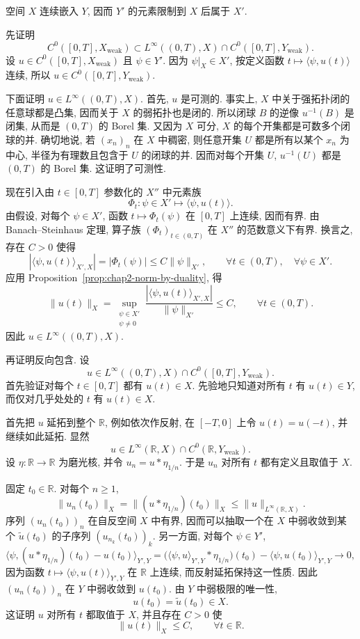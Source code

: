 \begin{Proof}
空间 $X$ 连续嵌入 $Y$, 因而 $Y'$ 的元素限制到 $X$ 后属于 $X'$.

先证明
\[
 C^0([0,T],X_{\mathrm{weak}})
 \subset L^\infty((0,T),X)\cap C^0([0,T],Y_{\mathrm{weak}}).
\]
设 $u\in C^0([0,T],X_{\mathrm{weak}})$ 且 $\psi\in Y'$. 因为 $\psi|_X\in X'$, 按定义函数 $t\mapsto\langle\psi,u(t)\rangle$ 连续, 所以 $u\in C^0([0,T],Y_{\mathrm{weak}})$.

下面证明 $u\in L^\infty((0,T),X)$. 首先, $u$ 是可测的. 事实上, $X$ 中关于强拓扑闭的任意球都是凸集, 因而关于 $X$ 的弱拓扑也是闭的. 所以闭球 $B$ 的逆像 $u^{-1}(B)$ 是闭集, 从而是 $(0,T)$ 的 Borel 集. 又因为 $X$ 可分, $X$ 的每个开集都是可数多个闭球的并. 确切地说, 若 $(x_n)_n$ 在 $X$ 中稠密, 则任意开集 $U$ 都是所有以某个 $x_n$ 为中心, 半径为有理数且包含于 $U$ 的闭球的并. 因而对每个开集 $U$, $u^{-1}(U)$ 都是 $(0,T)$ 的 Borel 集. 这证明了可测性.

现在引入由 $t\in[0,T]$ 参数化的 $X''$ 中元素族
\[
 \Phi_t:\psi\in X'\longmapsto\langle\psi,u(t)\rangle.
\]
由假设, 对每个 $\psi\in X'$, 函数 $t\mapsto\Phi_t(\psi)$ 在 $[0,T]$ 上连续, 因而有界. 由 Banach--Steinhaus 定理, 算子族 $(\Phi_t)_{t\in(0,T)}$ 在 $X''$ 的范数意义下有界. 换言之, 存在 $C>0$ 使得
\[
 |\langle\psi,u(t)\rangle_{X',X}|=|\Phi_t(\psi)|
 \leq C\|\psi\|_{X'},
 \qquad\forall t\in(0,T),\quad\forall\psi\in X'.
\]
应用 Proposition~\ref{prop:chap2-norm-by-duality}, 得
\[
 \|u(t)\|_X
 =\sup_{\substack{\psi\in X'\\\psi\neq0}}
 \frac{|\langle\psi,u(t)\rangle_{X',X}|}{\|\psi\|_{X'}}
 \leq C,
 \qquad\forall t\in(0,T).
\]
因此 $u\in L^\infty((0,T),X)$.

再证明反向包含. 设
\[
 u\in L^\infty((0,T),X)\cap C^0([0,T],Y_{\mathrm{weak}}).
\]
首先验证对每个 $t\in[0,T]$ 都有 $u(t)\in X$. 先验地只知道对所有 $t$ 有 $u(t)\in Y$, 而仅对几乎处处的 $t$ 有 $u(t)\in X$.

首先把 $u$ 延拓到整个 $\mathbb{R}$, 例如依次作反射, 在 $[-T,0]$ 上令 $u(t)=u(-t)$, 并继续如此延拓. 显然
\[
 u\in L^\infty(\mathbb{R},X)\cap C^0(\mathbb{R},Y_{\mathrm{weak}}).
\]
设 $\eta:\mathbb{R}\to\mathbb{R}$ 为磨光核, 并令 $u_n=u*\eta_{1/n}$. 于是 $u_n$ 对所有 $t$ 都有定义且取值于 $X$.

固定 $t_0\in\mathbb{R}$. 对每个 $n\geq1$,
\[
 \|u_n(t_0)\|_X=\|(u*\eta_{1/n})(t_0)\|_X
 \leq\|u\|_{L^\infty(\mathbb{R},X)}.
\]
序列 $(u_n(t_0))_n$ 在自反空间 $X$ 中有界, 因而可以抽取一个在 $X$ 中弱收敛到某个 $\widetilde u(t_0)$ 的子序列 $(u_{n_k}(t_0))_k$. 另一方面, 对每个 $\psi\in Y'$,
\[
 \langle\psi,(u*\eta_{1/n})(t_0)-u(t_0)\rangle_{Y',Y}
 =\bigl(\langle\psi,u\rangle_{Y',Y}*\eta_{1/n}\bigr)(t_0)
  -\langle\psi,u(t_0)\rangle_{Y',Y}
 \longrightarrow0,
\]
因为函数 $t\mapsto\langle\psi,u(t)\rangle_{Y',Y}$ 在 $\mathbb{R}$ 上连续, 而反射延拓保持这一性质. 因此 $(u_n(t_0))_n$ 在 $Y$ 中弱收敛到 $u(t_0)$. 由 $Y$ 中弱极限的唯一性,
\[
 u(t_0)=\widetilde u(t_0)\in X.
\]
这证明 $u$ 对所有 $t$ 都取值于 $X$, 并且存在 $C>0$ 使
\begin{equation}
 \|u(t)\|_X\leq C,\qquad\forall t\in\mathbb{R}.
 \label{eq:chap2-weak-continuity-pointwise-bound}
\end{equation}


\end{Proof}

